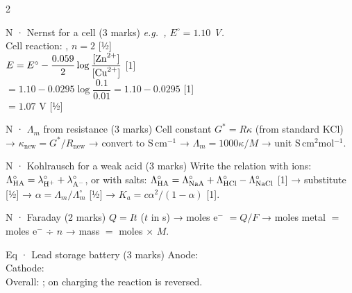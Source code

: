 \documentclass[10pt,a4paper]{extarticle}
\newcommand{\mk}[1]{{\scriptsize\color{black!55}[#1]}}
\begin{document}
\begin{multicols}{2}
\begin{skel}{N · Nernst for a cell (3 marks)}
\textit{e.g.\ , $E^\circ=1.10$ V.}\\
Cell reaction: , $n=2$ \mk{½}\\
$E=E^\circ-\dfrac{0.059}{2}\log\dfrac{[\ce{Zn^2+}]}{[\ce{Cu^2+}]}$ \mk{1}\\
$=1.10-0.0295\log\dfrac{0.1}{0.01}=1.10-0.0295$ \mk{1}\\
$=\boxed{1.07\text{ V}}$ \mk{½}
\end{skel}
\begin{skel}{N · $\Lambda_m$ from resistance (3 marks)}
Cell constant $G^*=R\kappa$ (from standard KCl) → $\kappa_\text{new}=G^*/R_\text{new}$ → convert to S\,cm$^{-1}$ → $\Lambda_m=1000\kappa/M$ → unit S\,cm$^2$mol$^{-1}$.
\end{skel}
\begin{skel}{N · Kohlrausch for a weak acid (3 marks)}
Write the relation with ions: $\Lambda^\circ_{\ce{HA}}=\lambda^\circ_{\ce{H+}}+\lambda^\circ_{\ce{A-}}$, or with salts: $\Lambda^\circ_{\ce{HA}}=\Lambda^\circ_{\ce{NaA}}+\Lambda^\circ_{\ce{HCl}}-\Lambda^\circ_{\ce{NaCl}}$ \mk{1} → substitute \mk{½} → $\alpha=\Lambda_m/\Lambda^\circ_m$ \mk{½} → $K_a=c\alpha^2/(1-\alpha)$ \mk{1}.
\end{skel}
\begin{skel}{N · Faraday (2 marks)}
$Q=It$ ($t$ in s) → moles e$^-$ $=Q/F$ → moles metal $=$ moles e$^-$ ÷ $n$ → mass $=$ moles × $M$.
\end{skel}
\begin{skel}{Eq · Lead storage battery (3 marks)}
Anode: \\
Cathode: \\
Overall: ; on charging the reaction is reversed.
\end{skel}


\end{multicols}
\end{document}

